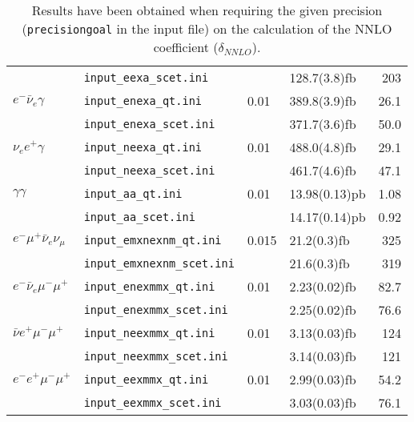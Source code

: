 \begin{table}
\begin{tabular}{llllr}
& \texttt{input\_eexa\_scet.ini} &      & 128.7(3.8)fb & 203 \\[2pt] %
\href{\mcfmprocs/process295.html}{$e^-\bar\nu_e\gamma$}
& \texttt{input\_enexa\_qt.ini}   & 0.01 & 389.8(3.9)fb & 26.1 \\ %
& \texttt{input\_enexa\_scet.ini} &      & 371.7(3.6)fb & 50.0 \\[2pt] %
\href{\mcfmprocs/process290.html}{$\nu_e e^+\gamma$}
& \texttt{input\_neexa\_qt.ini}   & 0.01 & 488.0(4.8)fb & 29.1 \\ %
& \texttt{input\_neexa\_scet.ini} &      & 461.7(4.6)fb & 47.1 \\[2pt] %
\href{\mcfmprocs/process285.html}{$\gamma\gamma$}
& \texttt{input\_aa\_qt.ini}   & 0.01 & 13.98(0.13)pb & 1.08 \\ %
& \texttt{input\_aa\_scet.ini} &      & 14.17(0.14)pb & 0.92 \\[2pt] %
\href{\mcfmprocs/process61.html}{$e^-\mu^+\bar\nu_e\nu_\mu$}
& \texttt{input\_emxnexnm\_qt.ini}   & 0.015 & 21.2(0.3)fb  & 325 \\ %
& \texttt{input\_emxnexnm\_scet.ini} &       & 21.6(0.3)fb  & 319 \\[2pt] %
\href{\mcfmprocs/process76.html}{$e^- \bar\nu_e \mu^-\mu^+$}
& \texttt{input\_enexmmx\_qt.ini}   & 0.01   & 2.23(0.02)fb & 82.7 \\ %
& \texttt{input\_enexmmx\_scet.ini} &        & 2.25(0.02)fb & 76.6 \\[2pt] %
\href{\mcfmprocs/process71.html}{$\bar\nu e^+ \mu^- \mu^+$}
& \texttt{input\_neexmmx\_qt.ini}   & 0.01   & 3.13(0.03)fb & 124 \\ %
& \texttt{input\_neexmmx\_scet.ini} &        & 3.14(0.03)fb & 121 \\[2pt] %
\href{\mcfmprocs/process81.html}{$e^- e^+ \mu^- \mu^+$}
& \texttt{input\_eexmmx\_qt.ini}   & 0.01    & 2.99(0.03)fb & 54.2 \\ %
& \texttt{input\_eexmmx\_scet.ini} &         & 3.03(0.03)fb & 76.1 \\ %
\hline
\end{tabular}
\caption{Results have been obtained
when requiring the given precision (\texttt{precisiongoal} in the input file)
on the calculation of the NNLO coefficient ($\delta_{NNLO}$).}
\label{table:nnlo10}
\end{table}
\renewcommand{\arraystretch}{1.0}
